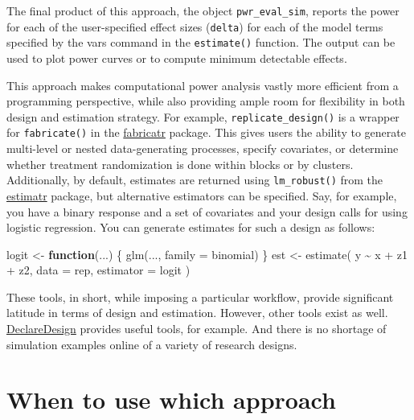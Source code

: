 \documentclass[
  12pt,
]{book}
\newenvironment{Shaded}{\begin{snugshade}}{\end{snugshade}}
\newcommand{\AttributeTok}[1]{\textcolor[rgb]{0.77,0.63,0.00}{#1}}
\newcommand{\ControlFlowTok}[1]{\textcolor[rgb]{0.13,0.29,0.53}{\textbf{#1}}}
\newcommand{\FunctionTok}[1]{\textcolor[rgb]{0.00,0.00,0.00}{#1}}
\newcommand{\NormalTok}[1]{#1}
\newcommand{\OtherTok}[1]{\textcolor[rgb]{0.56,0.35,0.01}{#1}}
\newcommand{\SpecialCharTok}[1]{\textcolor[rgb]{0.00,0.00,0.00}{#1}}
\theoremstyle{definition}
\theoremstyle{definition}
\theoremstyle{definition}
\theoremstyle{remark}
\begin{document}
The final product of this approach, the object \texttt{pwr\_eval\_sim},
reports the power for each of the user-specified effect sizes
(\texttt{delta}) for each of the model terms specified by the vars
command in the \texttt{estimate()} function. The output can be used to
plot power curves or to compute minimum detectable effects.

This approach makes computational power analysis vastly more efficient
from a programming perspective, while also providing ample room for
flexibility in both design and estimation strategy. For example,
\texttt{replicate\_design()} is a wrapper for \texttt{fabricate()} in
the \href{https://declaredesign.org/r/fabricatr/}{fabricatr} package.
This gives users the ability to generate multi-level or nested
data-generating processes, specify covariates, or determine whether
treatment randomization is done within blocks or by clusters.
Additionally, by default, estimates are returned using
\texttt{lm\_robust()} from the
\href{https://declaredesign.org/r/estimatr/}{estimatr} package, but
alternative estimators can be specified. Say, for example, you have a
binary response and a set of covariates and your design calls for using
logistic regression. You can generate estimates for such a design as
follows:

\begin{Shaded}
\begin{Highlighting}[]
\NormalTok{logit }\OtherTok{\textless{}{-}} \ControlFlowTok{function}\NormalTok{(...) \{}
  \FunctionTok{glm}\NormalTok{(..., }\AttributeTok{family =}\NormalTok{ binomial)}
\NormalTok{\}}
\NormalTok{est }\OtherTok{\textless{}{-}} \FunctionTok{estimate}\NormalTok{(}
\NormalTok{  y }\SpecialCharTok{\textasciitilde{}}\NormalTok{ x }\SpecialCharTok{+}\NormalTok{ z1 }\SpecialCharTok{+}\NormalTok{ z2,}
  \AttributeTok{data =}\NormalTok{ rep, }\AttributeTok{estimator =}\NormalTok{ logit}
\NormalTok{)}
\end{Highlighting}
\end{Shaded}

These tools, in short, while imposing a particular workflow, provide
significant latitude in terms of design and estimation. However, other
tools exist as well.
\href{https://declaredesign.org/r/declaredesign/articles/DeclareDesign_101.html}{DeclareDesign}
provides useful tools, for example. And there is no shortage of
simulation examples online of a variety of research designs.

\hypertarget{when-to-use-which-approach}{%
\section{When to use which approach}\label{when-to-use-which-approach}}
\end{document}
